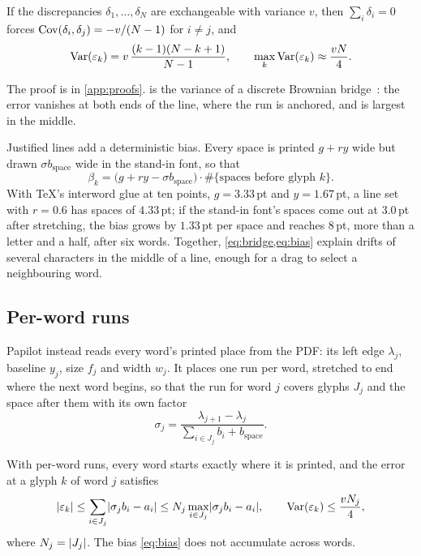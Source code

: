 \begin{theorem}
\label{thm:drift}
If the discrepancies $\delta_1, \dots, \delta_N$ are exchangeable with
variance $v$, then $\sum_i \delta_i = 0$ forces
$\operatorname{Cov}(\delta_i, \delta_j) = -v/(N-1)$ for $i \ne j$, and
\begin{equation}
  \operatorname{Var}(\varepsilon_k) = v\, \frac{(k-1)(N-k+1)}{N-1},
  \qquad
  \max_k \operatorname{Var}(\varepsilon_k) \approx \frac{v N}{4} .
  \label{eq:bridge}
\end{equation}
\end{theorem}

The proof is in \cref{app:proofs}.  is the variance of a
discrete Brownian bridge~\cite{billingsley1999}: the error vanishes at both
ends of the line, where the run is anchored, and is largest in the middle.

Justified lines add a deterministic bias. Every space is printed $g + r y$
wide but drawn $\sigma b_{\text{space}}$ wide in the stand-in font, so that
\begin{equation}
  \beta_k = \bigl(g + r y - \sigma b_{\text{space}}\bigr) \cdot
  \#\{\text{spaces before glyph } k\} .
  \label{eq:bias}
\end{equation}
With \TeX{}'s interword glue at ten points, $g = 3.33$\,pt and $y = 1.67$\,pt,
a line set with $r = 0.6$ has spaces of $4.33$\,pt; if the stand-in font's
spaces come out at $3.0$\,pt after stretching, the bias grows by $1.33$\,pt per
space and reaches $8$\,pt, more than a letter and a half, after six words. Together,
\cref{eq:bridge,eq:bias} explain drifts of several characters in the middle of
a line, enough for a drag to select a neighbouring word.

\subsection{Per-word runs}

Papilot instead reads every word's printed place from the PDF: its left edge
$\lambda_j$, baseline $y_j$, size $f_j$ and width $w_j$. It places one run per
word, stretched to end where the next word begins, so that the run for word
$j$ covers glyphs $J_j$ and the space after them with its own factor
\begin{equation}
  \sigma_j = \frac{\lambda_{j+1} - \lambda_j}
    {\sum_{i \in J_j} b_i + b_{\text{space}}} .
\end{equation}

\begin{theorem}
\label{thm:per-word}
With per-word runs, every word starts exactly where it is printed, and the
error at a glyph $k$ of word $j$ satisfies
\begin{equation}
  \lvert\varepsilon_k\rvert \le \sum_{i \in J_j} \lvert\sigma_j b_i - a_i\rvert
  \le N_j \max_{i \in J_j} \lvert\sigma_j b_i - a_i\rvert,
  \qquad
  \operatorname{Var}(\varepsilon_k) \le \frac{v N_j}{4} ,
  \label{eq:per-word}
\end{equation}
where $N_j = \lvert J_j\rvert$. The bias \cref{eq:bias} does not accumulate across
words.
\end{theorem}

